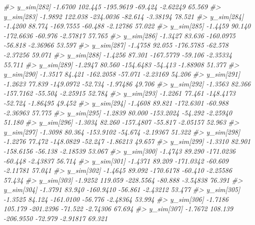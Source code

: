 \documentclass[
  10pt,
  italian,
  a4paper,
  extrafontsizes,onecolumn,openright
  ]{memoir}
\newenvironment{Shaded}{\begin{snugshade}}{\end{snugshade}}
\newcommand{\CommentTok}[1]{\textcolor[rgb]{0.56,0.35,0.01}{\textit{#1}}}
\begin{document}
\begin{Shaded}
\begin{Highlighting}[]
\CommentTok{\#\textgreater{}   y\_sim[282] {-}1.6700 102.445 {-}195.9619 {-}69.424 {-}2.62249 65.569}
\CommentTok{\#\textgreater{}   y\_sim[283] {-}1.9892 122.038 {-}234.0036 {-}82.614 {-}3.38194 78.521}
\CommentTok{\#\textgreater{}   y\_sim[284] {-}1.4200  88.774 {-}169.7555 {-}60.488 {-}2.12786 57.022}
\CommentTok{\#\textgreater{}   y\_sim[285] {-}1.4459  90.140 {-}172.6636 {-}60.976 {-}2.57817 57.765}
\CommentTok{\#\textgreater{}   y\_sim[286] {-}1.3427  83.636 {-}160.0975 {-}56.818 {-}2.36966 53.597}
\CommentTok{\#\textgreater{}   y\_sim[287] {-}1.4758  92.055 {-}176.5785 {-}62.578 {-}2.37256 59.071}
\CommentTok{\#\textgreater{}   y\_sim[288] {-}1.4256  87.301 {-}167.5779 {-}59.106 {-}2.35334 55.711}
\CommentTok{\#\textgreater{}   y\_sim[289] {-}1.2947  80.560 {-}154.6483 {-}54.413 {-}1.88908 51.377}
\CommentTok{\#\textgreater{}   y\_sim[290] {-}1.3517  84.421 {-}162.2058 {-}57.071 {-}2.23169 54.206}
\CommentTok{\#\textgreater{}   y\_sim[291] {-}1.2623  77.839 {-}149.0972 {-}52.734 {-}1.97486 49.706}
\CommentTok{\#\textgreater{}   y\_sim[292] {-}1.3563  82.366 {-}157.7162 {-}55.504 {-}2.25915 52.784}
\CommentTok{\#\textgreater{}   y\_sim[293] {-}1.2261  77.461 {-}148.4173 {-}52.724 {-}1.86495 49.452}
\CommentTok{\#\textgreater{}   y\_sim[294] {-}1.4608  89.821 {-}172.6301 {-}60.988 {-}2.36963 57.775}
\CommentTok{\#\textgreater{}   y\_sim[295] {-}1.2839  80.000 {-}153.2024 {-}54.292 {-}2.25940 51.180}
\CommentTok{\#\textgreater{}   y\_sim[296] {-}1.3034  82.260 {-}157.4807 {-}55.817 {-}2.05157 52.963}
\CommentTok{\#\textgreater{}   y\_sim[297] {-}1.3098  80.364 {-}153.9102 {-}54.674 {-}2.19367 51.322}
\CommentTok{\#\textgreater{}   y\_sim[298] {-}1.2276  77.472 {-}148.0829 {-}52.247 {-}1.86213 49.657}
\CommentTok{\#\textgreater{}   y\_sim[299] {-}1.3310  82.901 {-}158.6156 {-}56.138 {-}2.18539 53.067}
\CommentTok{\#\textgreater{}   y\_sim[300] {-}1.4743  89.290 {-}171.0236 {-}60.448 {-}2.43837 56.714}
\CommentTok{\#\textgreater{}   y\_sim[301] {-}1.4371  89.209 {-}171.0342 {-}60.609 {-}2.11781 57.041}
\CommentTok{\#\textgreater{}   y\_sim[302] {-}1.4645  89.092 {-}170.6178 {-}60.410 {-}2.25586 57.434}
\CommentTok{\#\textgreater{}   y\_sim[303] {-}1.9252 119.059 {-}228.5564 {-}80.888 {-}3.54838 76.391}
\CommentTok{\#\textgreater{}   y\_sim[304] {-}1.3791  83.940 {-}160.9410 {-}56.861 {-}2.43212 53.477}
\CommentTok{\#\textgreater{}   y\_sim[305] {-}1.3525  84.124 {-}161.0100 {-}56.776 {-}2.48364 53.994}
\CommentTok{\#\textgreater{}   y\_sim[306] {-}1.7186 105.179 {-}201.2396 {-}71.522 {-}2.74306 67.694}
\CommentTok{\#\textgreater{}   y\_sim[307] {-}1.7672 108.139 {-}206.9550 {-}72.979 {-}2.91817 69.321}

\end{Highlighting}
\end{Shaded}
\end{document}
